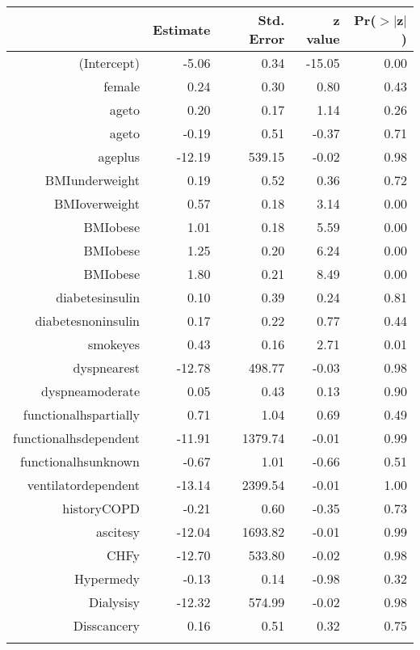 
\bigskip\bigskip
\centering
\begin{tabular}{rrrrr}
  \hline
 & Estimate & Std. Error & z value & Pr($>$$|$z$|$) \\ 
  \hline
(Intercept) & -5.06 & 0.34 & -15.05 & 0.00 \\ 
  female & 0.24 & 0.30 & 0.80 & 0.43 \\ 
  age\-65\-to\-74 & 0.20 & 0.17 & 1.14 & 0.26 \\ 
  age\-75\-to\-84 & -0.19 & 0.51 & -0.37 & 0.71 \\ 
  age\-85\-plus & -12.19 & 539.15 & -0.02 & 0.98 \\ 
  BMI\-underweight & 0.19 & 0.52 & 0.36 & 0.72 \\ 
  BMI\-overweight & 0.57 & 0.18 & 3.14 & 0.00 \\ 
  BMI\-obese\-1 & 1.01 & 0.18 & 5.59 & 0.00 \\ 
  BMI\-obese\-2 & 1.25 & 0.20 & 6.24 & 0.00 \\ 
  BMI\-obese\-3 & 1.80 & 0.21 & 8.49 & 0.00 \\ 
  diabetes\-insulin & 0.10 & 0.39 & 0.24 & 0.81 \\ 
  diabetes\-noninsulin & 0.17 & 0.22 & 0.77 & 0.44 \\ 
  smoke\-yes & 0.43 & 0.16 & 2.71 & 0.01 \\ 
  dyspnea\-rest & -12.78 & 498.77 & -0.03 & 0.98 \\ 
  dyspnea\-moderate & 0.05 & 0.43 & 0.13 & 0.90 \\ 
  functional\-hs\-partially & 0.71 & 1.04 & 0.69 & 0.49 \\ 
  functional\-hs\-dependent & -11.91 & 1379.74 & -0.01 & 0.99 \\ 
  functional\-hs\-unknown & -0.67 & 1.01 & -0.66 & 0.51 \\ 
  ventilator\-dependent & -13.14 & 2399.54 & -0.01 & 1.00 \\ 
  history\-COPD & -0.21 & 0.60 & -0.35 & 0.73 \\ 
  ascites\-y & -12.04 & 1693.82 & -0.01 & 0.99 \\ 
  CHF\-y & -12.70 & 533.80 & -0.02 & 0.98 \\ 
  Hyper\-med\-y & -0.13 & 0.14 & -0.98 & 0.32 \\ 
  Dialysis\-y & -12.32 & 574.99 & -0.02 & 0.98 \\ 
  Diss\-cancer\-y & 0.16 & 0.51 & 0.32 & 0.75 \\ 
$$
\end{tabular}
